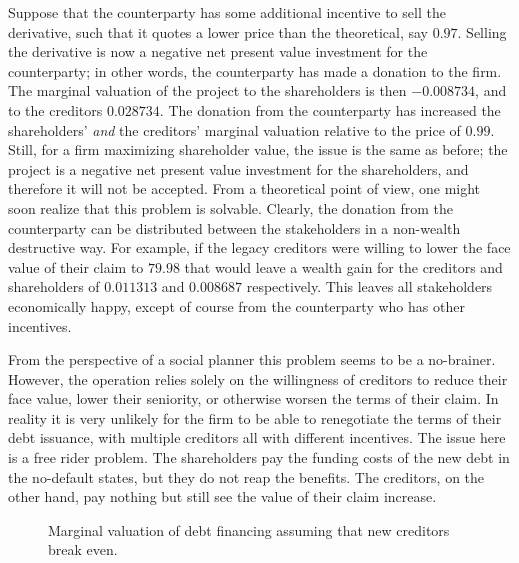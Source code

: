 \documentclass[main.tex]{subfiles}
\begin{document}
        Suppose that the counterparty has some additional incentive to sell the derivative,
        such that it quotes a lower price than the theoretical, say $\num{0.97}$.
        Selling the derivative is now a negative net present value investment for the counterparty;
        in other words, the counterparty has made a donation to the firm. 
        The marginal valuation of the project to the shareholders is then $\num{-0.008734}$,
        and to the creditors $\num{0.028734}$.
        The donation from the counterparty has increased the shareholders' 
        \textit{and} the creditors' marginal valuation relative to the price of $\num{0.99}$.
        Still, for a firm maximizing shareholder value, the issue is the same as before;
        the project is a negative net present value investment for the shareholders,
        and therefore it will not be accepted.
        From a theoretical point of view, one might soon realize that this problem is solvable.
        Clearly, the donation from the counterparty can be distributed between the 
        stakeholders in a non-wealth destructive way. 
        For example, if the legacy creditors were willing to lower the face value of their claim
        to $\num{79.98}$ that would leave a wealth gain for the creditors and shareholders
        of $\num{0.011313}$ and $\num{0.008687}$ respectively.
        This leaves all stakeholders economically happy, 
        except of course from the counterparty who has other incentives.

        From the perspective of a social planner this problem seems to be a no-brainer. 
        However, the operation relies solely on the willingness of creditors to 
        reduce their face value, lower their seniority, or otherwise worsen the terms of their claim.
        In reality it is very unlikely for the firm to be able to renegotiate 
        the terms of their debt issuance, with multiple creditors all with different incentives.
        The issue here is a free rider problem. 
        The shareholders pay the funding costs of the new debt in the no-default states,
        but they do not reap the benefits.
        The creditors, on the other hand, pay nothing 
        but still see the value of their claim increase.

        \begin{figure}
            \centering
            \resizebox{\textwidth}{!}{%
                
            }
            \caption{
                Marginal valuation of debt financing 
                assuming that new creditors break even.
            }
            \label{fig:marginal-value-debt-financing}
        \end{figure}
\end{document}
